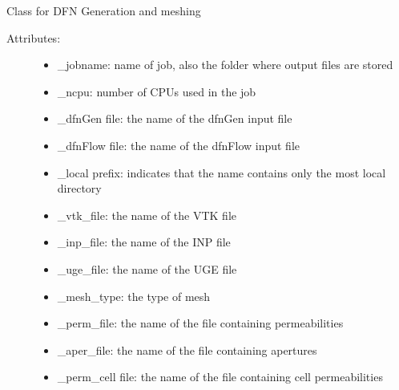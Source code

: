 \documentclass[letterpaper,10pt,english]{sphinxmanual}
\begin{document}
\begin{fulllineitems}
\label{pydfnworks:pydfnworks.DFNWORKS}
Class for DFN Generation and meshing
\begin{description}
\item[{Attributes:}] \leavevmode\begin{itemize}
\item {} 
\_jobname: name of job, also the folder where output files are stored

\item {} 
\_ncpu: number of CPUs used in the job

\item {} 
\_dfnGen file: the name of the dfnGen input file

\item {} 
\_dfnFlow file: the name of the dfnFlow input file

\item {} 
\_local prefix: indicates that the name contains only the most local directory

\item {} 
\_vtk\_file: the name of the VTK file

\item {} 
\_inp\_file: the name of the INP file

\item {} 
\_uge\_file: the name of the UGE file

\item {} 
\_mesh\_type: the type of mesh

\item {} 
\_perm\_file: the name of the file containing permeabilities

\item {} 
\_aper\_file: the name of the file containing apertures

\item {} 
\_perm\_cell file: the name of the file containing cell permeabilities


\end{itemize}
\end{description}
\end{fulllineitems}
\end{document}
